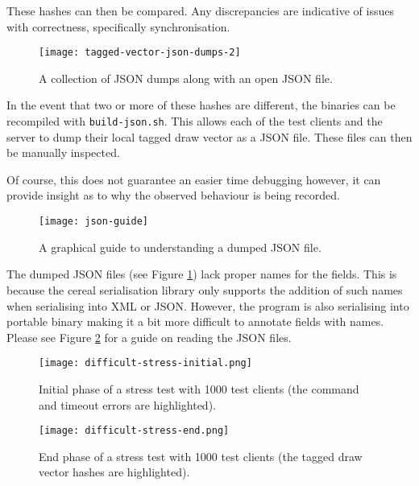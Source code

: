 \documentclass[article]{uom-coursework}
\begin{document}
These hashes can then be compared. Any discrepancies are
indicative of issues with correctness, specifically
synchronisation.

\begin{figure}[H]
\centering
\texttt{[image: tagged-vector-json-dumps-2]}
\caption{A collection of JSON dumps along with an open JSON file.}
\label{fig:jsondump}
\end{figure}

In the event that two or more of these hashes are different, the
binaries can be recompiled with \texttt{build-json.sh}. This
allows each of the test clients and the server to dump their
local tagged draw vector as a JSON file. These files can then be
manually inspected.

Of course, this does not guarantee an easier time debugging
however, it can provide insight as to why the observed behaviour
is being recorded.

\begin{figure}[H]
\centering
\texttt{[image: json-guide]}
\caption{A graphical guide to understanding a dumped JSON file.}
\label{fig:jsondumpguide}
\end{figure}

\begin{note}
    The dumped JSON files (see Figure \ref{fig:jsondump}) lack
    proper names for the fields. This is because the cereal
    serialisation library only supports the addition of such
    names when serialising into XML or JSON. However, the
    program is also serialising into portable binary making it a
    bit more difficult to annotate fields with names.  Please
    see Figure \ref{fig:jsondumpguide} for a guide on reading
    the JSON files.
\end{note}

\begin{figure}[H]
\centering
\texttt{[image: difficult-stress-initial.png]}
\caption{Initial phase of a stress test with 1000 test clients
(the command and timeout errors are highlighted).}
\label{fig:initial1000stress}
\end{figure}

\begin{figure}[H]
\centering
\texttt{[image: difficult-stress-end.png]}
\caption{End phase of a stress test with 1000 test clients (the
tagged draw vector hashes are highlighted).}
\label{fig:end1000stress}
\end{figure}
\end{document}

